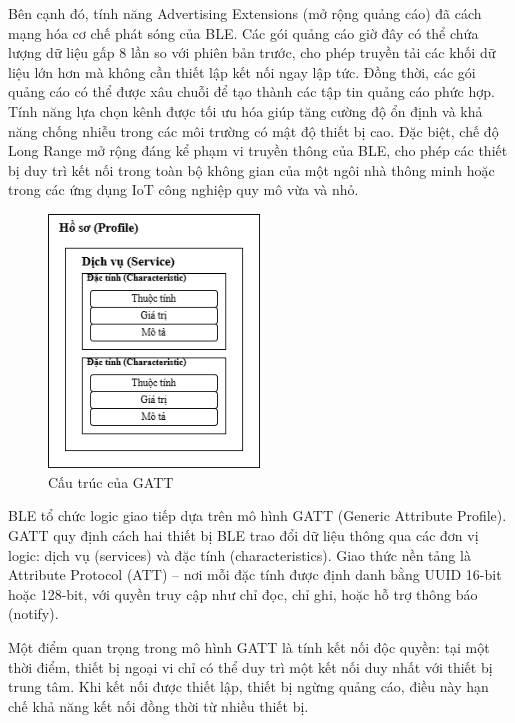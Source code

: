 Bên cạnh đó, tính năng Advertising Extensions (mở rộng quảng cáo) đã 
cách mạng hóa cơ chế phát sóng của BLE. Các gói quảng cáo giờ đây có 
thể chứa lượng dữ liệu gấp 8 lần so với phiên bản trước, cho phép 
truyền tải các khối dữ liệu lớn hơn mà không cần thiết lập kết nối 
ngay lập tức. Đồng thời, các gói quảng cáo có thể được xâu chuỗi 
để tạo thành các tập tin quảng cáo phức hợp. Tính năng lựa chọn kênh 
được tối ưu hóa giúp tăng cường độ ổn định và khả năng chống nhiễu 
trong các môi trường có mật độ thiết bị cao. Đặc biệt, chế độ Long 
Range mở rộng đáng kể phạm vi truyền thông của BLE, cho phép các thiết 
bị duy trì kết nối trong toàn bộ không gian của một ngôi nhà thông minh 
hoặc trong các ứng dụng IoT công nghiệp quy mô vừa và nhỏ.




\begin{figure}[htbp]
	\centering
 	\includegraphics[width=0.5\textwidth]{images/gatt.drawio.png}
	\caption{Cấu trúc của GATT}
	\label{gatt}
\end{figure}

BLE tổ chức logic giao tiếp dựa trên mô hình GATT 
(Generic Attribute Profile). GATT quy định cách hai thiết bị BLE 
trao đổi dữ liệu thông qua các đơn vị logic: dịch vụ (services) 
và đặc tính (characteristics). Giao thức nền tảng là Attribute Protocol 
(ATT) – nơi mỗi đặc tính được định danh bằng UUID 16-bit hoặc 128-bit, 
với quyền truy cập như chỉ đọc, chỉ ghi, hoặc hỗ trợ thông báo (notify).

Một điểm quan trọng trong mô hình GATT là tính kết nối độc quyền: 
tại một thời điểm, thiết bị ngoại vi chỉ có thể duy trì một kết nối 
duy nhất với thiết bị trung tâm. Khi kết nối được thiết lập, thiết bị 
ngừng quảng cáo, điều này hạn chế khả năng kết nối đồng thời từ 
nhiều thiết bị.

